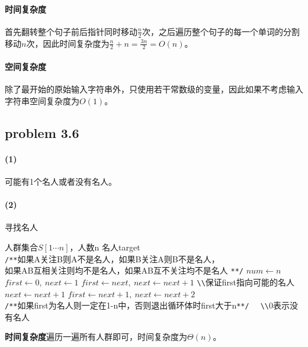 \documentclass[11pt]{ctexart}
\begin{document}
	\paragraph{时间复杂度}首先翻转整个句子前后指针同时移动$\frac{n}{2}$次，之后遍历整个句子的每一个单词的分割移动$n$次，因此时间复杂度为$\frac{n}{2}+n=\frac{3n}{2}=O(n)$。
	\paragraph{空间复杂度}除了最开始的原始输入字符串外，只使用若干常数级的变量，因此如果不考虑输入字符串空间复杂度为$O(1)$。
	\newpage
	\subsection*{problem 3.6}
	\paragraph{(1)}
	可能有1个名人或者没有名人。
	\paragraph{(2)}
	\begin{algorithm}
		\caption{寻找名人}
		\label{find}
		\begin{algorithmic}[1]
			\Require 人群集合$S[1\cdots n]$，人数n
			\Ensure 名人target
			\\
			\verb|/**|如果A关注B则A不是名人，如果B关注A则B不是名人，\\
			如果AB互相关注则均不是名人，如果AB互不关注均不是名人
			\verb|**/|
			\State $num \gets n$
			\State $first \gets 0,\ next \gets 1$
			\State $first \gets next,\ next \gets next+1$ \verb|\\|保证first指向可能的名人
			\State $next \gets next+1 $
			\Else
			\State $first \gets next+1,\ next \gets next+2 $
			\EndIf
			\EndWhile\\
			\verb|/**|如果first为名人则一定在1-n中，否则退出循环体时first大于n\verb|**/|
			\State {}\verb|  \\|0表示没有名人
			\EndFunction
		\end{algorithmic}
	\end{algorithm}
	\textbf{时间复杂度}遍历一遍所有人群即可，时间复杂度为$\Theta(n)$。
	\newpage
\end{document}

